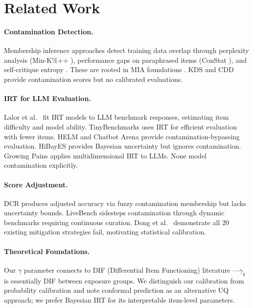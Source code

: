 \documentclass[11pt,a4paper]{article}
\begin{document}
\section{Related Work}

\paragraph{Contamination Detection.}
Membership inference approaches detect training data overlap through perplexity analysis (Min-K\%++ \cite{shi2024detecting}), performance gaps on paraphrased items (ConStat \cite{dekoninck2024constat}), and self-critique entropy \cite{xu2024benchmarking}. These are rooted in MIA foundations \cite{shokri2017membership,carlini2022quantifying}. KDS \cite{zhang2024kds} and CDD \cite{deng2024investigating} provide contamination scores but no calibrated evaluations.

\paragraph{IRT for LLM Evaluation.}
Lalor et al.\ \cite{lalor2024benchmarking} fit IRT models to LLM benchmark responses, estimating item difficulty and model ability. TinyBenchmarks \cite{polo2024tinybenchmarks} uses IRT for efficient evaluation with fewer items. HELM \cite{liang2023holistic} and Chatbot Arena \cite{zheng2023judging} provide contamination-bypassing evaluation. HiBayES provides Bayesian uncertainty but ignores contamination. Growing Pains \cite{burnell2023rethink} applies multidimensional IRT to LLMs. None model contamination explicitly.

\paragraph{Score Adjustment.}
DCR \cite{oren2024proving} produces adjusted accuracy via fuzzy contamination membership but lacks uncertainty bounds. LiveBench \cite{white2024livebench} sidesteps contamination through dynamic benchmarks requiring continuous curation. Dong et al.\ \cite{dong2025emperor} demonstrate all 20 existing mitigation strategies fail, motivating statistical calibration.

\paragraph{Theoretical Foundations.}
Our $\gamma$ parameter connects to DIF (Differential Item Functioning) literature \cite{holland1993differential,thissen1993detection,zumbo1999handbook}---$\gamma_k$ is essentially DIF between exposure groups. We distinguish our calibration from probability calibration \cite{guo2017calibration,platt1999probabilistic} and note conformal prediction \cite{angelopoulos2023conformal} as an alternative UQ approach; we prefer Bayesian IRT for its interpretable item-level parameters.
\end{document}

